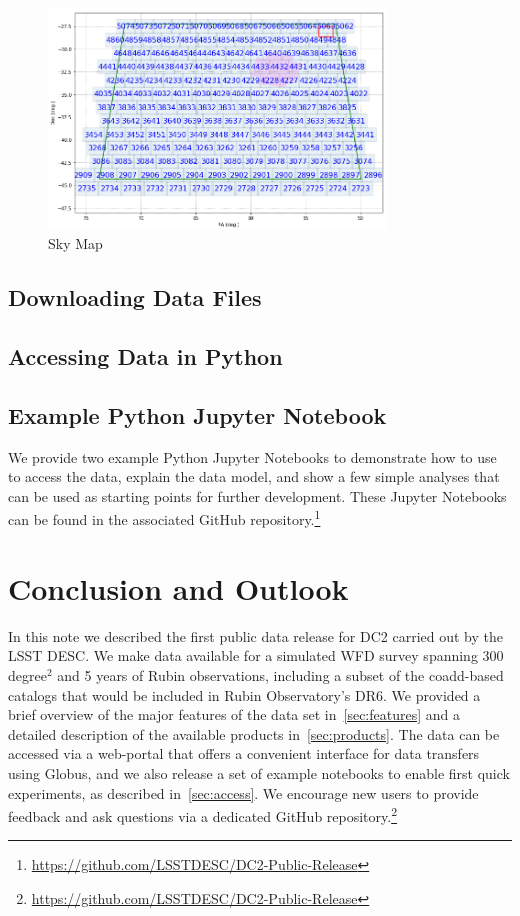 \documentclass[modern]{descnote}
\begin{document}
\begin{figure}[tbh!]
    \centering
    \includegraphics[width=0.8\textwidth]{figs/skymap.png}
    \caption{Sky Map}
    \label{fig:skymap}
\end{figure}



\subsection{Downloading Data Files}
\label{sec:download}

\subsection{Accessing Data in Python}
\label{sec:gcr}


\subsection{Example Python Jupyter Notebook}
\label{sec:notebooks}

We provide two example Python Jupyter Notebooks to demonstrate how to use  to access the data, explain the data model, and show a few simple analyses that can be used as starting points for further development. 
These Jupyter Notebooks can be found in the associated GitHub repository.\footnote{\url{https://github.com/LSSTDESC/DC2-Public-Release}}

\section{Conclusion and Outlook}
\label{sec:outlook}

In this note we described the first public data release for DC2 carried out by the LSST DESC. We make data available for a simulated WFD survey spanning 300 degree$^2$ and 5 years of Rubin observations, including a subset of the coadd-based catalogs that would be included in Rubin Observatory's DR6. We provided a brief overview of the major features of the data set in~\autoref{sec:features} and a detailed description of the available products in~\autoref{sec:products}. The data can be accessed via a web-portal that offers a convenient interface for data transfers using Globus, and we also release a set of example notebooks to enable first quick experiments, as described in~\autoref{sec:access}. We encourage new users to provide feedback and ask questions via a dedicated GitHub repository.\footnote{\url{https://github.com/LSSTDESC/DC2-Public-Release}}
\end{document}
